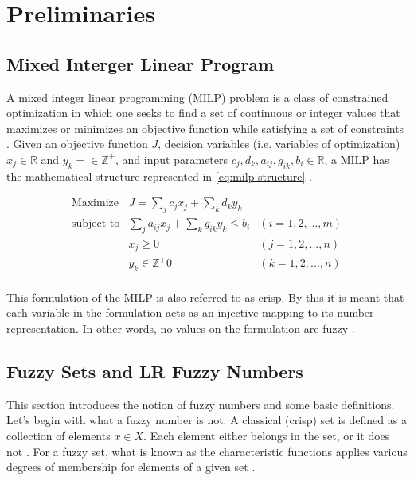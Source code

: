 \documentclass[11pt,a4paper,final]{article}
\author{Alexander Brown}
\date{\today}
\title{}
\theoremstyle{definition}
\begin{document}
\tableofcontents


\section{Preliminaries}
\label{sec:org24728ce}

\subsection{Mixed Interger Linear Program}
\label{sec:orgf576321}
A mixed integer linear programming (MILP) problem is a class of constrained optimization in which one seeks to find a
set of continuous or integer values that maximizes or minimizes an objective function while satisfying a set of
constraints \cite{chen-2010-applied}. Given an objective function \(J\), decision variables (i.e. variables of
optimization) \(x_j \in \mathbb{R}\) and \(y_k = \in \mathbb{Z}^+\), and input parameters \(c_j, d_k, a_{ij}, g_{ik}, b_i \in \mathbb{R}\), a MILP has the
mathematical structure represented in \autoref{eq:milp-structure} \cite{chen-2010-applied}.

\begin{equation}
\label{eq:milp-structure}
\begin{array}{lll}
\text{Maximize}   & J = \sum_j c_j x_j + \sum_k d_k y_k            &                 \\
\text{subject to} & \sum_j a_{ij} x_j + \sum_k g_{ik} y_k  \le b_i & (i = 1,2,...,m) \\
                  & x_j \ge 0                                      & (j = 1,2,...,n) \\
                  & y_k \in \mathbb{Z^+}0                          & (k = 1,2,...,n) \\
\end{array}
\end{equation}

This formulation of the MILP is also referred to as crisp. By this it is meant that each variable in the formulation
acts as an injective mapping to its number representation. In other words, no values on the formulation are fuzzy
\cite{kaur-2016-introd-fuzzy}.

\subsection{Fuzzy Sets and LR Fuzzy Numbers}
\label{sec:org93888dc}
This section introduces the notion of fuzzy numbers and some basic definitions. Let's begin with what a fuzzy number is
not. A classical (crisp) set is defined as a collection of elements \(x \in X\). Each element either belongs in the set, or
it does not \cite{zimmermann-2001-fuzzy-set}. For a fuzzy set, what is known as the characteristic functions applies
various degrees of membership for elements of a given set \cite{zimmermann-2001-fuzzy-set}.
\end{document}

